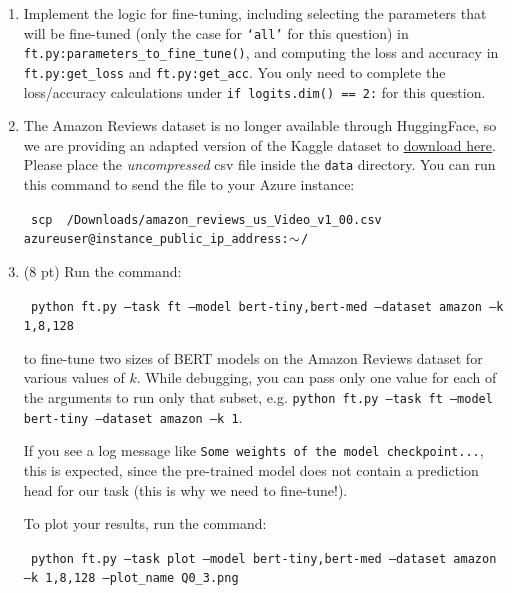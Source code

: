 \documentclass[12pt]{article}
\begin{document}
    \begin{enumerate}
        \item Implement the logic for fine-tuning, including selecting the parameters that will be fine-tuned (only the case for \texttt{`all'} for this question) in \texttt{ft.py:\allowbreak parameters\_to\allowbreak \_fine\_tune()}, and computing the loss and accuracy in \texttt{ft.py:\allowbreak get\_loss} and \texttt{ft.py:\allowbreak get\_acc}. You only need to complete the loss/accuracy calculations under \texttt{if logits.dim() == 2:} for this question.
        \item The Amazon Reviews dataset is no longer available through HuggingFace, so we are providing an adapted version of the Kaggle dataset to \href{https://drive.google.com/file/d/1RLCPCEvJVTvUbn-D426Avwg6hynSBgU3/view?usp=sharing}{download here}. Please place the \textit{uncompressed} csv file inside the \texttt{data} directory. You can run this command to send the file to your Azure instance:

            {
            \small\texttt{
                scp ~/Downloads/amazon\_reviews\_us\_Video\_v1\_00.csv azureuser@{instance\_public\_ip\_address}:$\small\sim$/
            }
        }
        \item (8 pt) Run the command:

            {\small\texttt{
            python ft.py --task ft --model bert-tiny,bert-med --dataset amazon --k 1,8,128
        }}

        to fine-tune two sizes of BERT models on the Amazon Reviews dataset for various values of $k$. While debugging, you can pass only one value for each of the arguments to run only that subset, e.g. \texttt{python ft.py --task ft --model bert-tiny --dataset amazon --k 1}.

        If you see a log message like \texttt{Some weights of the model checkpoint...}, this is expected, since the pre-trained model does not contain a prediction head for our task (this is why we need to fine-tune!).

        To plot your results, run the command:

            {\small\texttt{
            python ft.py --task plot --model bert-tiny,bert-med --dataset amazon --k 1,8,128 --plot\_name Q0\_3.png
        }}


\end{enumerate}
\end{document}
